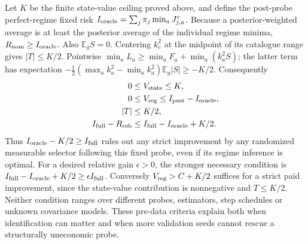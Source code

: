 Let $K$ be the finite state-value ceiling proved above, and define the
post-probe perfect-regime fixed risk
$I_{\rm oracle}=\sum_j\pi_j\min_aJ_{j,a}^{r}$.
Because a posterior-weighted average is at least the posterior average of the
individual regime minima, $R_{\rm nom}\ge I_{\rm oracle}$.
Also $\mathbb E_gS=0$. Centering $k_c^2$ at the midpoint of its catalogue range
gives $|T|\le K/2$.
Pointwise $\min_aL_a\ge\min_aF_a+\min_a(k_a^2S)$; the latter term has expectation
$-\tfrac12(\max_a k_a^2-\min_a k_a^2)\mathbb E_g|S|\ge-K/2$.
Consequently
\begin{align*}
0&\le V_{\rm state}\le K,\\
0&\le V_{\rm reg}\le I_{\rm post}-I_{\rm oracle},\\
|T|&\le K/2,\\
I_{\rm full}-R_{\rm rob}&\le I_{\rm full}-I_{\rm oracle}+K/2.
\end{align*}
Thus $I_{\rm oracle}-K/2\ge I_{\rm full}$ rules out any strict improvement by
any randomized measurable selector following this fixed probe, even if its
regime inference is optimal.
For a desired relative gain $\epsilon>0$, the stronger necessary condition is
$I_{\rm full}-I_{\rm oracle}+K/2\ge\epsilon I_{\rm full}$.
Conversely $V_{\rm reg}>C+K/2$ suffices for a strict paid improvement, since the
state-value contribution is nonnegative and $T\le K/2$.
Neither condition ranges over different probes, estimators, step schedules or
unknown covariance models.
These pre-data criteria explain both when identification can matter and when
more validation seeds cannot rescue a structurally uneconomic probe.
